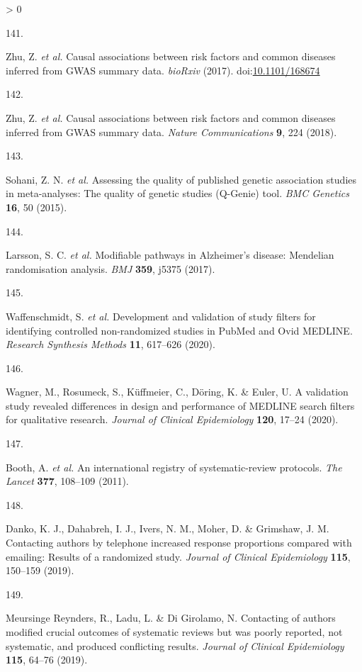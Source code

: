 \documentclass[a4paper, twoside]{templates/ociamthesis}
\newlength{\cslhangindent}
\newlength{\csllabelwidth}
\newenvironment{CSLReferences}[3] %
 {%
  \setlength{\parindent}{0pt}
  \ifodd #1 \everypar{\setlength{\hangindent}{\cslhangindent}}\ignorespaces\fi
  \ifnum #2 > 0
  \setlength{\parskip}{#2\baselineskip}
  \fi
 }%
 {}
\newcommand{\CSLLeftMargin}[1]{\parbox[t]{\maxof{\widthof{#1}}{\csllabelwidth}}{#1}}
\newcommand{\CSLRightInline}[1]{\parbox[t]{\linewidth - \csllabelwidth}{#1}}
\begin{document}
\begin{CSLReferences}{0}{0}
\leavevmode\hypertarget{ref-zhu2017}{}%
\CSLLeftMargin{141. }
\CSLRightInline{Zhu, Z. \emph{et al.} Causal associations between risk factors and common diseases inferred from {GWAS} summary data. \emph{bioRxiv} (2017). doi:\href{https://doi.org/10.1101/168674}{10.1101/168674}}

\leavevmode\hypertarget{ref-zhu2018}{}%
\CSLLeftMargin{142. }
\CSLRightInline{Zhu, Z. \emph{et al.} Causal associations between risk factors and common diseases inferred from {GWAS} summary data. \emph{Nature Communications} \textbf{9}, 224 (2018).}

\leavevmode\hypertarget{ref-sohani2015}{}%
\CSLLeftMargin{143. }
\CSLRightInline{Sohani, Z. N. \emph{et al.} Assessing the quality of published genetic association studies in meta-analyses: The quality of genetic studies ({Q}-{Genie}) tool. \emph{BMC Genetics} \textbf{16}, 50 (2015).}

\leavevmode\hypertarget{ref-larsson2017b}{}%
\CSLLeftMargin{144. }
\CSLRightInline{Larsson, S. C. \emph{et al.} Modifiable pathways in {Alzheimer}'s disease: {Mendelian} randomisation analysis. \emph{BMJ} \textbf{359}, j5375 (2017).}

\leavevmode\hypertarget{ref-waffenschmidt2020}{}%
\CSLLeftMargin{145. }
\CSLRightInline{Waffenschmidt, S. \emph{et al.} Development and validation of study filters for identifying controlled non-randomized studies in {PubMed} and {Ovid MEDLINE}. \emph{Research Synthesis Methods} \textbf{11}, 617--626 (2020).}

\leavevmode\hypertarget{ref-wagner2020}{}%
\CSLLeftMargin{146. }
\CSLRightInline{Wagner, M., Rosumeck, S., Küffmeier, C., Döring, K. \& Euler, U. A validation study revealed differences in design and performance of {MEDLINE} search filters for qualitative research. \emph{Journal of Clinical Epidemiology} \textbf{120}, 17--24 (2020).}

\leavevmode\hypertarget{ref-booth2011}{}%
\CSLLeftMargin{147. }
\CSLRightInline{Booth, A. \emph{et al.} An international registry of systematic-review protocols. \emph{The Lancet} \textbf{377}, 108--109 (2011).}

\leavevmode\hypertarget{ref-danko2019}{}%
\CSLLeftMargin{148. }
\CSLRightInline{Danko, K. J., Dahabreh, I. J., Ivers, N. M., Moher, D. \& Grimshaw, J. M. Contacting authors by telephone increased response proportions compared with emailing: Results of a randomized study. \emph{Journal of Clinical Epidemiology} \textbf{115}, 150--159 (2019).}

\leavevmode\hypertarget{ref-meursingereynders2019}{}%
\CSLLeftMargin{149. }
\CSLRightInline{Meursinge Reynders, R., Ladu, L. \& Di Girolamo, N. Contacting of authors modified crucial outcomes of systematic reviews but was poorly reported, not systematic, and produced conflicting results. \emph{Journal of Clinical Epidemiology} \textbf{115}, 64--76 (2019).}


\end{CSLReferences}
\end{document}

